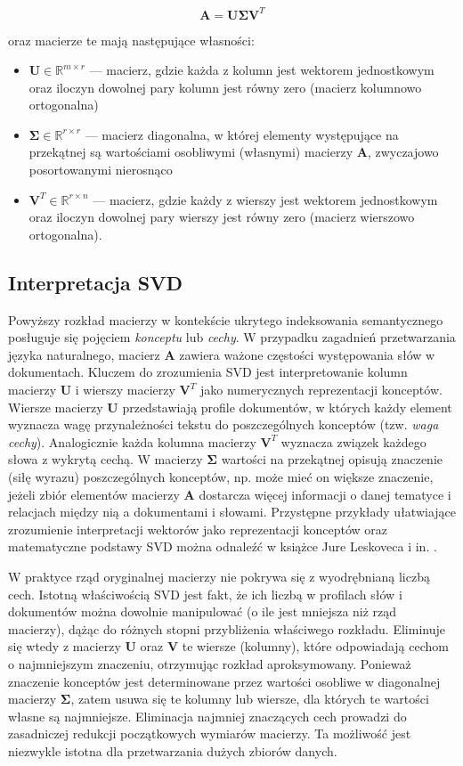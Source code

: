 \documentclass{pracamgr}
\begin{document}
\[
\mathbf{A} = \mathbf{U}\mathbf{\Sigma}\mathbf{V}^T
\]

oraz macierze te mają następujące własności:

\begin{itemize}
    \item $\mathbf{U} \in \mathbb{R}^{m \times r}$ --- macierz, gdzie każda z kolumn jest wektorem jednostkowym oraz iloczyn dowolnej pary kolumn jest równy zero (macierz kolumnowo ortogonalna)
    \item $\mathbf{\Sigma} \in \mathbb{R}^{r \times r}$ --- macierz diagonalna, w której elementy występujące na przekątnej są wartościami osobliwymi (własnymi) macierzy $\mathbf{A}$, zwyczajowo posortowanymi nierosnąco
    \item $\mathbf{V}^T \in \mathbb{R}^{r \times n}$ --- macierz, gdzie każdy z wierszy jest wektorem jednostkowym oraz iloczyn dowolnej pary wierszy jest równy zero (macierz wierszowo ortogonalna).
\end{itemize}

\subsection{Interpretacja SVD}
Powyższy rozkład macierzy w kontekście ukrytego indeksowania semantycznego posługuje się pojęciem \textit{konceptu} lub \textit{cechy}. W przypadku zagadnień przetwarzania języka naturalnego, macierz $\mathbf{A}$ zawiera ważone częstości występowania słów w dokumentach. Kluczem do zrozumienia SVD jest interpretowanie kolumn macierzy $\mathbf{U}$ i wierszy macierzy $\mathbf{V}^T$ jako numerycznych reprezentacji konceptów. Wiersze macierzy $\mathbf{U}$ przedstawiają profile dokumentów, w których każdy element wyznacza wagę przynależności tekstu do poszczególnych konceptów (tzw. \textit{waga cechy}). Analogicznie każda kolumna macierzy $\mathbf{V}^T$ wyznacza związek każdego słowa z wykrytą cechą. W macierzy $\mathbf{\Sigma}$ wartości na przekątnej opisują znaczenie (siłę wyrazu) poszczególnych konceptów, np. może mieć on większe znaczenie, jeżeli zbiór elementów macierzy $\mathbf{A}$ dostarcza więcej informacji o danej tematyce i relacjach między nią a dokumentami i słowami. Przystępne przykłady ułatwiające zrozumienie interpretacji wektorów jako reprezentacji konceptów oraz matematyczne podstawy SVD można odnaleźć w książce Jure Leskoveca i in. \cite{leskovec}.

W praktyce rząd oryginalnej macierzy nie pokrywa się z wyodrębnianą liczbą cech. Istotną właściwością SVD jest fakt, że ich liczbą w profilach słów i dokumentów można dowolnie manipulować (o ile jest mniejsza niż rząd macierzy), dążąc do różnych stopni przybliżenia właściwego rozkładu. Eliminuje się wtedy z macierzy $\mathbf{U}$ oraz $\mathbf{V}$ te wiersze (kolumny), które odpowiadają cechom o najmniejszym znaczeniu, otrzymując rozkład aproksymowany. Ponieważ znaczenie konceptów jest determinowane przez wartości osobliwe w diagonalnej macierzy $\mathbf{\Sigma}$, zatem usuwa się te kolumny lub wiersze, dla których te wartości własne są najmniejsze. Eliminacja najmniej znaczących cech prowadzi do zasadniczej redukcji początkowych wymiarów macierzy. Ta możliwość jest niezwykle istotna dla przetwarzania dużych zbiorów danych.
\end{document}
